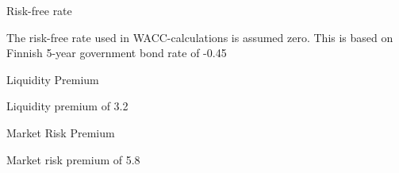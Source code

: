 Risk-free rate

The risk-free rate used in WACC-calculations is assumed zero. This is based on Finnish 5-year government bond rate of -0.45~%

Liquidity Premium

Liquidity premium of 3.2~%

Market Risk Premium 

Market risk premium of 5.8~%

